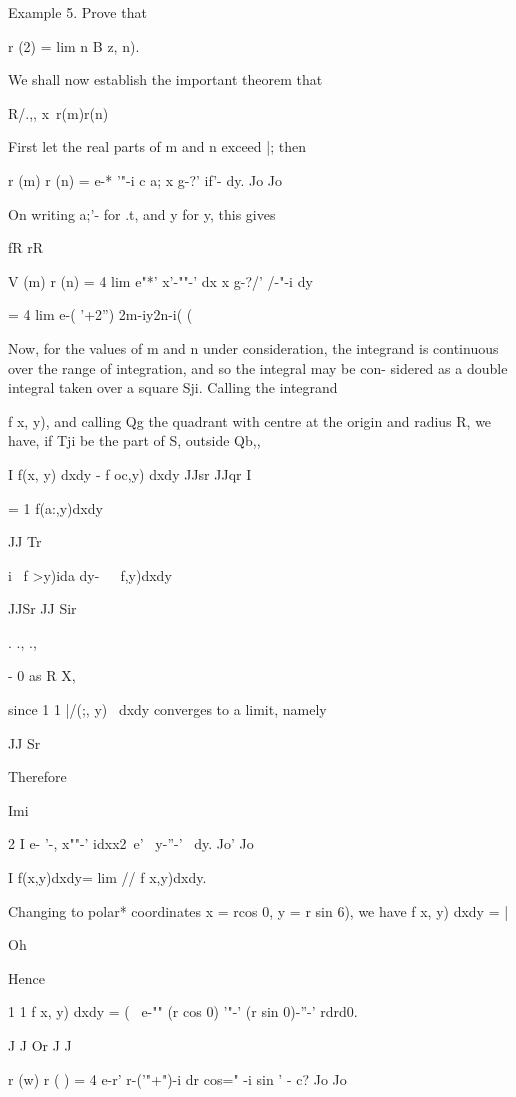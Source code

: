 Example 5. Prove that

r (2) = lim n B z, n).


We shall now establish the important theorem that

R/.,, x\ r(m)r(n)

First let the real parts of m and n exceed |; then

r (m) r (n) = e-* '"-i c a; x g-?' if'- dy. Jo Jo

On writing a;'- for .t, and y for y, this gives

fR rR

V (m) r (n) = 4 lim e"*' x'-""-' dx x g-?/' /-"-i dy

= 4 lim e-( '+2'') 2m-iy2n-i( ( \

Now, for the values of m and n under consideration, the integrand is
continuous over the range of integration, and so the integral may be
con- sidered as a double integral taken over a square Sji. Calling the
integrand

%
%

f x, y), and calling Qg the quadrant with centre at the origin and
radius R, we have, if Tji be the part of S, outside Qb,,

I f(x, y) dxdy - f oc,y) dxdy JJsr JJqr I

= 1 f(a:,y)dxdy

 JJ Tr

i \ f >y)ida dy-\ \ \ f,y)dxdy\

JJSr JJ Sir

  . ., .,

- 0 as R X,

since 1 1 |/(;, y) \ dxdy converges to a limit, namely

JJ Sr

Therefore

Imi

2 I e- '-, x""-' idxx2\ e' \ y-''-' \ dy. Jo' Jo

I f(x,y)dxdy= lim // f x,y)dxdy.

Changing to polar* coordinates x = rcos 0, y = r sin 6), we have f x,
y) dxdy = |

Oh

Hence

1 1 f x, y) dxdy = ( \ e-"" (r cos 0) '"-' (r sin 0)-''-' rdrd0.

J J Or J J

r (w) r ( ) = 4 e-r' r-('"+")-i dr cos=" -i sin ' - c? Jo Jo

